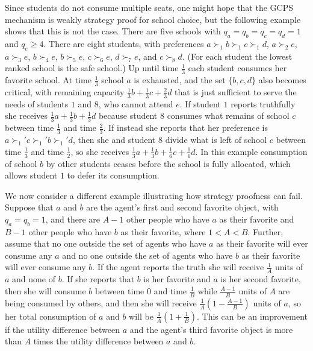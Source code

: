 \documentclass[12pt, A4paper]{article}
\theoremstyle{definition}
\begin{document}
Since students do not consume multiple seats, one might hope that the GCPS mechanism is weakly strategy proof for school choice, but the following example shows that this is not the case.  There are five schools with $q_a = q_b = q_c = q_d = 1$ and $q_e \ge 4$.  There are eight students, with preferences $a \succ_1 b \succ_1 c \succ_1 d$, $a \succ_2 e$,  $a \succ_3 e$,  $b \succ_4 e$,   $b \succ_5 e$,   $c \succ_6 e$,  $d \succ_7 e$, and  $c \succ_8 d$.  (For each student the lowest ranked school is the safe school.)  Up until time $\tfrac13$ each student consumes her favorite school.  At time $\tfrac13$ school $a$ is exhausted, and the set $\{b,c,d\}$ also becomes critical, with remaining capacity $\tfrac13 b + \tfrac13 c + \tfrac23 d$ that is just sufficient to serve the needs of students $1$ and $8$, who cannot attend $e$.  If student $1$ reports truthfully she receives $\tfrac13 a + \tfrac13 b + \tfrac13 d$ because student $8$ consumes what remains of school $c$ between time $\tfrac13$ and time $\tfrac23$.  If instead she reports that her preference is $a \succ_1' c \succ_1' b \succ_1' d$, then she and student $8$ divide what is left of school $c$ between time $\tfrac13$ and time $\tfrac12$, so she receives $\tfrac13 a + \tfrac13 b + \tfrac16 c + \tfrac16 d$.  In this example consumption of school $b$ by other students ceases before the school is fully allocated, which allows student $1$ to defer its consumption.

We now consider a different example illustrating how strategy proofness can fail.  Suppose that $a$ and $b$ are the agent's first and second favorite object, with $q_a = q_b = 1$, and there are $A-1$ other people who have $a$ as their favorite and $B - 1$ other people who have $b$ as their favorite, where  $1 < A < B$.  Further, assume that no one outside the set of agents  who have $a$ as their favorite will ever consume any $a$ and no one outside the set of agents  who have $b$ as their favorite will ever consume any $b$.  If the agent reports the truth she will receive $\tfrac{1}{A}$ units of $a$ and none of $b$.  If she reports that $b$ is her favorite and $a$ is her second favorite, then she will consume $b$ between time $0$ and time $\tfrac{1}{B}$ while $\tfrac{A-1}{B}$ units of $A$ are being consumed by others, and then she will
receive $\tfrac{1}{A}(1 - \tfrac{A-1}{B})$ units of $a$, so her total consumption of $a$ and $b$ will be $\tfrac{1}{A}(1 + \tfrac{1}{B})$.  This can be an improvement if the utility difference between $a$ and the agent's third favorite object is more than $A$ times the utility difference between $a$ and $b$.
\end{document}
